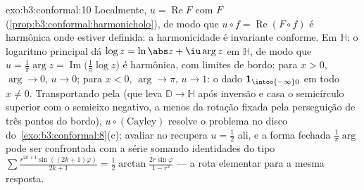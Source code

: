 \begin{solution}{exo:b3:conformal:10}
Localmente, $u = \operatorname{Re}F$ com $F$ 
(\cref{prop:b3:conformal:harmonicholo}), de modo que $u\circ f =
\operatorname{Re}(F\circ f)$ é harmônica onde estiver definida:
a harmonicidade é invariante conforme. Em $\mathbb H$: o
logaritmo principal dá $\log z = \ln\abs z + \iu\arg z$
 em $\mathbb H$, de modo que $u = \frac1\pi\arg z =
\operatorname{Im}\bigl(\frac1\pi\log z\bigr)$ é harmônica,
com limites de bordo: para $x > 0$, $\arg \to 0$, $u \to 0$;
para $x < 0$, $\arg \to \pi$, $u \to 1$: o dado $\mathbf
1_{\intoo{-\infty}0}$ em todo $x \neq 0$. Transportando pela
 (que leva $\mathbb D \to \mathbb H$ após
inversão e casa o semicírculo superior com o semieixo
negativo, a menos da rotação fixada pela perseguição de três pontos
do bordo), $u\circ(\text{Cayley})$ resolve o problema no disco do~\cref{exo:b3:conformal:8}(c); avaliar no 
recupera $u = \frac12$ ali, e a forma fechada
$\frac1\pi\arg$ pode ser confrontada com a série somando
identidades do tipo $\sum\frac{r^{2k+1}\sin((2k+1)\varphi)}{2k+1} =
\frac12\arctan\frac{2r\sin\varphi}{1 - r^2}$
--- a rota elementar para a mesma resposta.
\end{solution}

